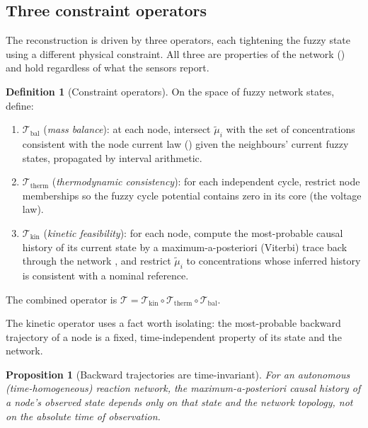 \documentclass[11pt,twocolumn,a4paper]{article}
\theoremstyle{thmstyle}
\newtheorem{proposition}[theorem]{Proposition}
\theoremstyle{definition}
\newtheorem{definition}[theorem]{Definition}
\theoremstyle{remark}
\begin{document}
\subsection{Three constraint operators}

The reconstruction is driven by three operators, each tightening the fuzzy
state using a different physical constraint. All three are properties of
the network () and hold regardless of what the sensors
report.

\begin{definition}[Constraint operators]
\label{def:operators}
On the space of fuzzy network states, define:
\begin{enumerate}[label=(\roman*),leftmargin=2em,nosep]
\item $\mathcal{T}_{\mathrm{bal}}$ (\emph{mass balance}): at each node,
intersect $\tilde\mu_i$ with the set of concentrations consistent with the
node current law () given the neighbours' current
fuzzy states, propagated by interval arithmetic.
\item $\mathcal{T}_{\mathrm{therm}}$ (\emph{thermodynamic consistency}):
for each independent cycle, restrict node memberships so the fuzzy cycle
potential contains zero in its core (the voltage law).
\item $\mathcal{T}_{\mathrm{kin}}$ (\emph{kinetic feasibility}): for each
node, compute the most-probable causal history of its current state by a
maximum-a-posteriori (Viterbi) trace back through the network
\citep{viterbi1967error}, and restrict $\tilde\mu_i$ to concentrations
whose inferred history is consistent with a nominal reference.
\end{enumerate}
The combined operator is
$\mathcal{T}=\mathcal{T}_{\mathrm{kin}}\circ\mathcal{T}_{\mathrm{therm}}
\circ\mathcal{T}_{\mathrm{bal}}$.
\end{definition}

The kinetic operator uses a fact worth isolating: the most-probable
backward trajectory of a node is a fixed, time-independent property of its
state and the network.

\begin{proposition}[Backward trajectories are time-invariant]
\label{prop:timeinv}
For an autonomous (time-homogeneous) reaction network, the
maximum-a-posteriori causal history of a node's observed state depends only
on that state and the network topology, not on the absolute time of
observation.
\end{proposition}
\end{document}
